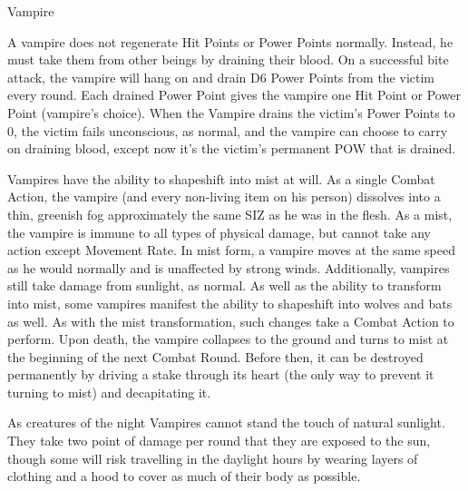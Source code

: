 \begin{samepage}
\begin{monsterbox}{Vampire}
\begin{rpg-monsteraction}
	\end{rpg-monsteraction}
	\begin{rpg-monsteraction}
                A vampire does not regenerate Hit Points or Power Points normally. Instead, he must take them from other beings by draining their blood. On a successful bite attack, the vampire will hang on and drain D6 Power Points from the victim every round. Each drained Power Point gives the vampire one Hit Point or Power Point (vampire’s choice). When the Vampire drains the victim’s Power Points to 0, the victim fails unconscious, as normal, and the vampire can choose to carry on draining blood, except now it’s the victim’s permanent POW that is drained.
	\end{rpg-monsteraction}
	\begin{rpg-monsteraction}[Shapeshifting]
		Vampires have the ability to shapeshift into mist at will. As a single Combat Action, the vampire (and every non-living item on his person) dissolves into a thin, greenish fog approximately the same SIZ as he was in the flesh. As a mist, the vampire is immune to all types of physical damage, but cannot take any action except Movement Rate. In mist form, a vampire moves at the same speed as he would normally and is unaffected by strong winds. Additionally, vampires still take damage from sunlight, as normal.
		As well as the ability to transform into mist, some vampires manifest the ability to shapeshift into wolves and bats as well. As with the mist transformation, such changes take a Combat Action to perform.
		Upon death, the vampire collapses to the ground and turns to mist at the beginning of the next Combat Round. Before then, it can be destroyed permanently by driving a stake through its heart (the only way to prevent it turning to mist) and decapitating it.
	\end{rpg-monsteraction}
	\begin{rpg-monsteraction}
		As creatures of the night Vampires cannot stand the touch of natural sunlight. They take two point of damage per round that they are exposed to the sun, though some will risk travelling in the daylight hours by wearing layers of clothing and a hood to cover as much of their body as possible.
	\end{rpg-monsteraction}
	\begin{rpg-monsteraction}

\end{rpg-monsteraction}
\end{monsterbox}
\end{samepage}
